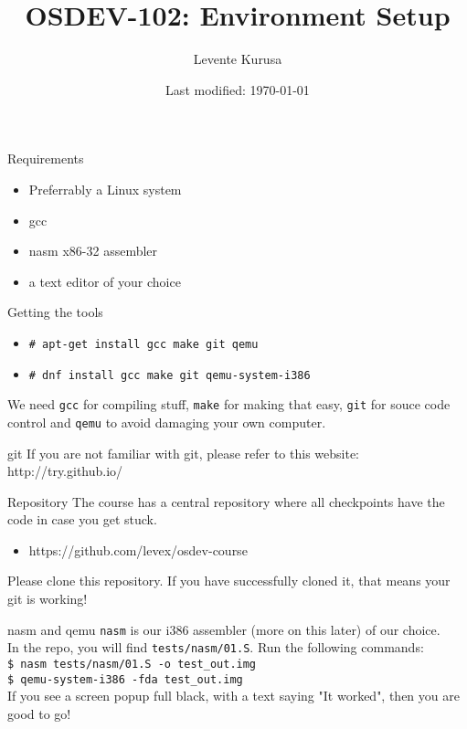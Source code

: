 \documentclass{beamer}
\title{OSDEV-102: Environment Setup}
\author{Levente Kurusa}
\institute{lkurusa@acm.org}
\date{Last modified: \today}
\begin{document}
\maketitle

\begin{frame}{Requirements}
  \begin{itemize}
		\item Preferrably a Linux system
		\item gcc
		\item nasm x86-32 assembler
		\item a text editor of your choice
  \end{itemize}
\end{frame}

\begin{frame}{Getting the tools}
  \begin{itemize}
		\item \texttt{\# apt-get install gcc make git qemu}
		\item \texttt{\# dnf install gcc make git qemu-system-i386}
  \end{itemize}
  We need \texttt{gcc} for compiling stuff, \texttt{make} for making that easy,
  \texttt{git} for souce code control and \texttt{qemu} to avoid damaging your own
  computer.
\end{frame}

\begin{frame}{git}
  If you are not familiar with git, please refer to this website: \\
  http://try.github.io/
\end{frame}

\begin{frame}{Repository}
  The course has a central repository where all checkpoints have the code in case you
  get stuck.
  \begin{itemize}
          \item https://github.com/levex/osdev-course
  \end{itemize}
  Please clone this repository. If you have successfully cloned it, that means your git
  is working!
\end{frame}

\begin{frame}{nasm and qemu}
  \texttt{nasm} is our i386 assembler (more on this later) of our choice. \\
  In the repo, you will find \texttt{tests/nasm/01.S}. Run the following commands: \\
  \texttt{\$ nasm tests/nasm/01.S -o test\_out.img} \\
  \texttt{\$ qemu-system-i386 -fda test\_out.img} \\
  If you see a screen popup full black, with a text saying "It worked", then you are
  good to go!
\end{frame}
\end{document}
